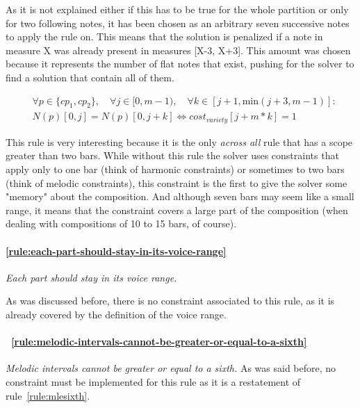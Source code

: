     As it is not explained either if this has to be true for the whole partition or only for two following notes, it has been chosen as an arbitrary seven successive notes to apply the rule on. This means that the solution is penalized if a note in measure X was already present in measures [X-3, X+3]. This amount was chosen because it represents the number of flat notes that exist, pushing for the solver to find a solution that contain all of them.

    \begin{equation} \begin{aligned}
    &\forall p \in \{cp_1, cp_2\}, \quad \forall j \in [0, m-1), \quad \forall k \in [j+1, \text{min} (j+3, m-1)] :\\ 
    &N(p)[0, j] = N(p)[0, j+k]\iff cost_{variety}[j+m*k]= 1
    \end{aligned} \end{equation}

    This rule is very interesting because it is the only \textit{across all} rule that has a scope greater than two bars. While without this rule the solver uses constraints that apply only to one bar (think of harmonic constraints) or sometimes to two bars (think of melodic constraints), this constraint is the first to give the solver some "memory" about the composition. And although seven bars may seem like a small range, it means that the constraint covers a large part of the composition (when dealing with compositions of 10 to 15 bars, of course).

    \paragraph{\hspace{.6cm}\ref{rule:each-part-should-stay-in-its-voice-range}}  \textit{Each part should stay in its voice range.}

    As was discussed before, there is no constraint associated to this rule, as it is already covered by the definition of the voice range.

    \paragraph{\hspace{0.6cm}~\ref{rule:melodic-intervals-cannot-be-greater-or-equal-to-a-sixth}}  \textit{Melodic intervals cannot be greater or equal to a sixth.}
    As was said before, no constraint must be implemented for this rule as it is a restatement of rule~\ref{rule:mlesixth}.


